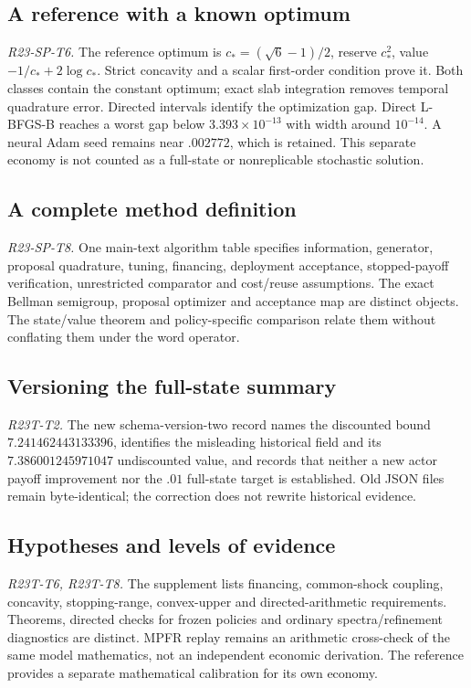\subsection{A reference with a known optimum}
\noindent\textit{R23-SP-T6.}
The reference optimum is $c_*=(\sqrt6-1)/2$, reserve $c_*^2$, value $-1/c_*+2\log c_*$. Strict concavity and a scalar first-order condition prove it. Both classes contain the constant optimum; exact slab integration removes temporal quadrature error. Directed intervals identify the optimization gap. Direct L-BFGS-B reaches a worst gap below $3.393\times10^{-13}$ with width around $10^{-14}$. A neural Adam seed remains near $.002772$, which is retained. This separate economy is not counted as a full-state or nonreplicable stochastic solution.

\subsection{A complete method definition}
\noindent\textit{R23-SP-T8.}
One main-text algorithm table specifies information, generator, proposal quadrature, tuning, financing, deployment acceptance, stopped-payoff verification, unrestricted comparator and cost/reuse assumptions. The exact Bellman semigroup, proposal optimizer and acceptance map are distinct objects. The state/value theorem and policy-specific comparison relate them without conflating them under the word operator.

\subsection{Versioning the full-state summary}
\noindent\textit{R23T-T2.}
The new schema-version-two record names the discounted bound $7.241462443133396$, identifies the misleading historical field and its $7.386001245971047$ undiscounted value, and records that neither a new actor payoff improvement nor the $.01$ full-state target is established. Old JSON files remain byte-identical; the correction does not rewrite historical evidence.

\subsection{Hypotheses and levels of evidence}
\noindent\textit{R23T-T6, R23T-T8.}
The supplement lists financing, common-shock coupling, concavity, stopping-range, convex-upper and directed-arithmetic requirements. Theorems, directed checks for frozen policies and ordinary spectra/refinement diagnostics are distinct. MPFR replay remains an arithmetic cross-check of the same model mathematics, not an independent economic derivation. The reference provides a separate mathematical calibration for its own economy.

